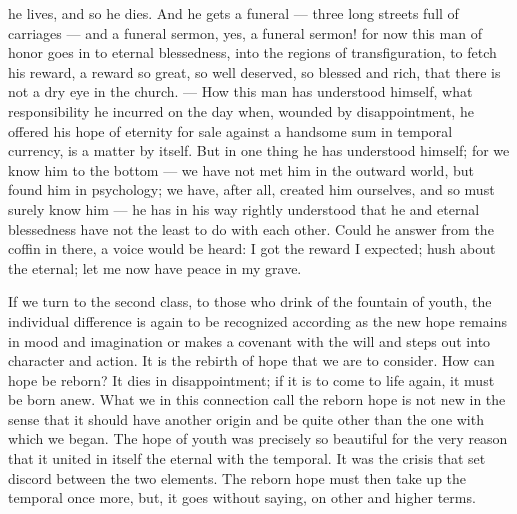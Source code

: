 \documentclass[12pt,a4paper,openany]{book}
\newcommand{\opage}[1]{\marginnote{\footnotesize\textit{[#1]}}}
\begin{document}
he lives, and so he dies. And he gets a funeral
--- three long streets full of carriages --- and a
funeral sermon, yes, a funeral sermon! for now this
man of honor goes in to eternal blessedness, into the regions
of transfiguration, to fetch his reward, a reward so great, so
well deserved, so blessed and rich, that there is not a dry eye
in the church. --- How this man has understood
himself, what responsibility he incurred on the day when,
wounded by disappointment, he offered his hope of eternity for sale against
a handsome sum in temporal currency, is a matter by
itself. But in one thing he has understood himself; for we know
him to the bottom --- we have not met him in the outward
world, but found him in psychology; we have,
after all, created him ourselves, and so must surely know him
--- he has in his way rightly understood that he and
eternal blessedness have not the least to do
with each other. Could he answer from the coffin in there,
a voice would be heard: I got the reward I expected;
hush about the eternal; let me now have peace in my grave.

If we turn to the second class, to those who
drink of the fountain of youth, the individual difference
is again to be recognized according as the new
hope remains in mood and imagination or makes a covenant
with the will and steps out into character and action.
It is the rebirth of hope that we are to consider. How
can hope be reborn? It dies in disappointment;
if it is to come to life again, it must be born anew.
What we in this connection call the reborn
hope is not new in the sense that it should have
another origin and be quite other than the one
with which we began. The hope of youth was precisely
\setcounter{footnote}{0}%
\opage{30}so beautiful for the very reason that it united in itself the eternal
with the temporal. It was the crisis that set discord
between the two elements. The reborn hope must then
take up the temporal once more, but, it goes without saying, on other
and higher terms.
\end{document}
